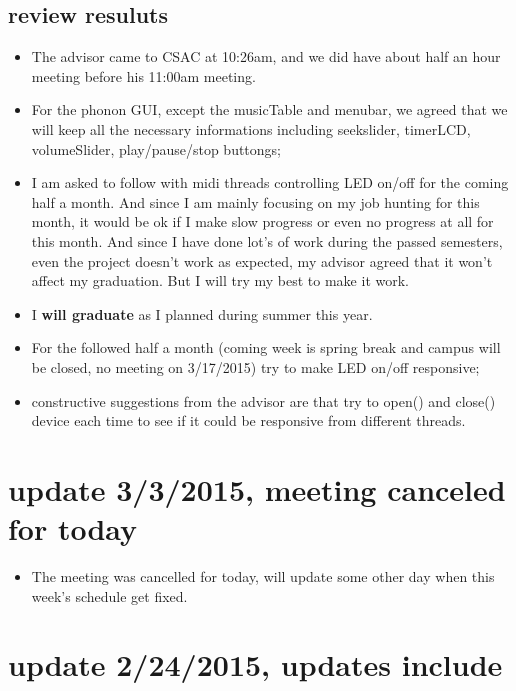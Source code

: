 \documentclass[9pt,b5paper]{article}
\begin{document}
\subsection{review resuluts}
\label{sec-3-4}
\begin{itemize}
\item The advisor came to CSAC at 10:26am, and we did have about half an hour meeting before his 11:00am meeting.
\item For the phonon GUI, except the musicTable and menubar, we agreed that we will keep all the necessary informations including seekslider, timerLCD, volumeSlider, play/pause/stop buttongs;
\item I am asked to follow with midi threads controlling LED on/off for the coming half a month. And since I am mainly focusing on my job hunting for this month, it would be ok if I make slow progress or even no progress at all for this month. And since I have done lot's of work during the passed semesters, even the project doesn't work as expected, my advisor agreed that it won't affect my graduation. But I will try my best to make it work.
\item I \textbf{will graduate} as I planned during summer this year.
\item For the followed half a month (coming week is spring break and campus will be closed, no meeting on 3/17/2015) try to make LED on/off responsive;
\item constructive suggestions from the advisor are that try to open() and close() device each time to see if it could be responsive from different threads.
\end{itemize}

\section{update 3/3/2015, meeting canceled for today}
\label{sec-4}
\begin{itemize}
\item The meeting was cancelled for today, will update some other day when this week's schedule get fixed.
\end{itemize}
\section{update 2/24/2015, updates include}
\label{sec-5}
\end{document}
